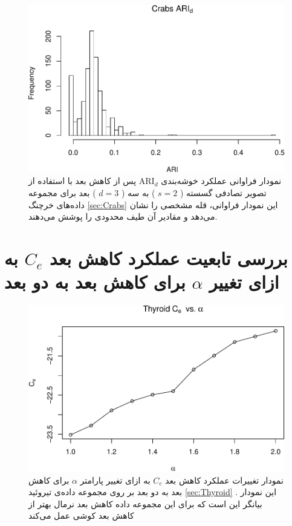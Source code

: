 \begin{figure}[H]
\centering
\includegraphics[width=0.7\linewidth]{Report_files/figure-latex/unnamed-chunk-18-7}
\caption{
نمودار فراوانی عملکرد خوشه‌بندی 
$\mathrm{ARI}_d$
پس از کاهش بعد با استفاده از تصویر تصادفی
گسسته (%
$s=2$%
)
به
سه (%
$d=3$%
)
بعد برای مجموعه داده‌های
خرچنگ
\ref{sec:Crabs}
این نمودار فراوانی،
قله
مشخصی را نشان 
می‌دهد
و مقادیر آن طیف 
محدودی
 را پوشش می‌دهند.
}
\end{figure}



\section{
بررسی تابعیت عملکرد کاهش بعد $C_e$ به ازای تغییر $\alpha$ برای کاهش بعد به دو بعد
}


\begin{figure}[H]
\centering
\includegraphics[width=0.7\linewidth]{Report_files/figure-latex/unnamed-chunk-20-1}
\caption{
نمودار تغییرات عملکرد کاهش بعد 
$C_e$
به ازای تغییر پارامتر
$\alpha$
برای کاهش بعد به 
دو
بعد بر روی مجموعه داده‌‌‌ی 
تیروئید
\ref{sec:Thyroid}
. این نمودار بیانگر این است که برای این مجموعه داده کاهش بعد 
نرمال
بهتر از کاهش بعد 
کوشی 
عمل می‌کند
}
\end{figure}


